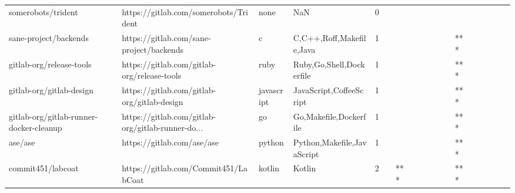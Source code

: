 \begin{tabular}{llllrlllllllllllll}
somerobots/trident                                 &              https://gitlab.com/somerobots/Trident &              none &                                                NaN &       0 &         &        &           &                &                 &        &           &           &          &          &       &              &          \\
sane-project/backends                              &           https://gitlab.com/sane-project/backends &                 c &                           C,C++,Roff,Makefile,Java &       1 &         &        &           &                &                 &        &           &       *** &          &          &       &              &          \\
gitlab-org/release-tools                           &        https://gitlab.com/gitlab-org/release-tools &              ruby &                           Ruby,Go,Shell,Dockerfile &       1 &         &        &           &                &                 &        &           &       *** &          &          &       &              &          \\
gitlab-org/gitlab-design                           &        https://gitlab.com/gitlab-org/gitlab-design &        javascript &                            JavaScript,CoffeeScript &       1 &         &        &           &                &                 &        &           &       *** &          &          &       &              &          \\
gitlab-org/gitlab-runner-docker-cleanup            &  https://gitlab.com/gitlab-org/gitlab-runner-do... &                go &                             Go,Makefile,Dockerfile &       1 &         &        &           &                &                 &        &           &       *** &          &          &       &              &          \\
ase/ase                                            &                         https://gitlab.com/ase/ase &            python &                         Python,Makefile,JavaScript &       1 &         &        &           &                &                 &        &           &       *** &          &          &       &              &          \\
commit451/labcoat                                  &               https://gitlab.com/Commit451/LabCoat &            kotlin &                                             Kotlin &       2 &         &    *** &           &                &                 &        &           &       *** &          &          &       &              &          \\

\end{tabular}
